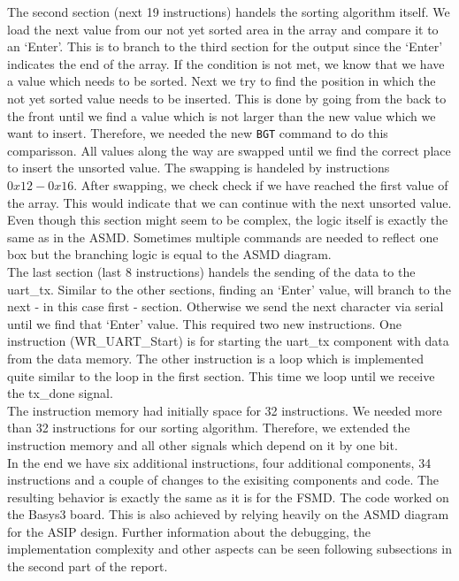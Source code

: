 \documentclass[conference]{IEEEtran}
\begin{document}
The second section (next 19 instructions) handels the sorting algorithm itself. We load the next value from our not yet sorted area in the array and compare it to an `Enter'. This is to branch to the third section for the output since the `Enter' indicates the end of the array. If the condition is not met, we know that we have a value which needs to be sorted. Next we try to find the position in which the not yet sorted value needs to be inserted. This is done by going from the back to the front until we find a value which is not larger than the new value which we want to insert. Therefore, we needed the new \texttt{BGT} command to do this comparisson. All values along the way are swapped until we find the correct place to insert the unsorted value. The swapping is handeled by instructions $0x12-0x16$. After swapping, we check check if we have reached the first value of the array. This would indicate that we can continue with the next unsorted value. Even though this section might seem to be complex, the logic itself is exactly the same as in the ASMD. Sometimes multiple commands are needed to reflect one box but the branching logic is equal to the ASMD diagram. \\
The last section (last 8 instructions) handels the sending of the data to the uart\_tx. Similar to the other sections, finding an `Enter' value, will branch to the next - in this case first - section. Otherwise we send the next character via serial until we find that `Enter' value. This required two new instructions. One instruction (WR\_UART\_Start) is for starting the uart\_tx component with data from the data memory. The other instruction is a loop which is implemented quite similar to the loop in the first section. This time we loop until we receive the tx\_done signal.\\
The instruction memory had initially space for 32 instructions. We needed more than 32 instructions for our sorting algorithm. Therefore, we extended the instruction memory and all other signals which depend on it by one bit. \\
In the end we have six additional instructions, four additional components, 34 instructions and a couple of changes to the exisiting components and code. The resulting behavior is exactly the same as it is for the FSMD. The code worked on the Basys3 board. This is also achieved by relying heavily on the ASMD diagram for the ASIP design. Further information about the debugging, the implementation complexity and other aspects can be seen following subsections in the second part of the report. \\
\end{document}
